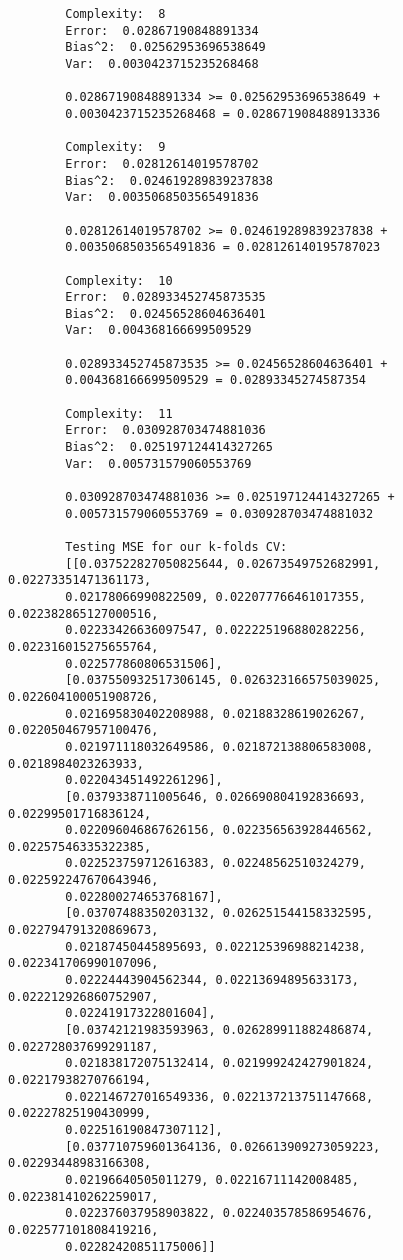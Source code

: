 \begin{verbatim}
        Complexity:  8
        Error:  0.02867190848891334
        Bias^2:  0.02562953696538649
        Var:  0.0030423715235268468
        
        0.02867190848891334 >= 0.02562953696538649 + 
        0.0030423715235268468 = 0.028671908488913336
        
        Complexity:  9
        Error:  0.02812614019578702
        Bias^2:  0.024619289839237838
        Var:  0.0035068503565491836
        
        0.02812614019578702 >= 0.024619289839237838 +
        0.0035068503565491836 = 0.028126140195787023
        
        Complexity:  10
        Error:  0.028933452745873535
        Bias^2:  0.02456528604636401
        Var:  0.004368166699509529
        
        0.028933452745873535 >= 0.02456528604636401 + 
        0.004368166699509529 = 0.02893345274587354
        
        Complexity:  11
        Error:  0.030928703474881036
        Bias^2:  0.025197124414327265
        Var:  0.005731579060553769
        
        0.030928703474881036 >= 0.025197124414327265 +
        0.005731579060553769 = 0.030928703474881032
        
        Testing MSE for our k-folds CV:  
        [[0.037522827050825644, 0.02673549752682991, 0.02273351471361173,
        0.02178066990822509, 0.022077766461017355, 0.022382865127000516,
        0.02233426636097547, 0.022225196880282256, 0.022316015275655764,
        0.022577860806531506], 
        [0.037550932517306145, 0.026323166575039025, 0.022604100051908726,
        0.021695830402208988, 0.02188328619026267, 0.022050467957100476,
        0.021971118032649586, 0.021872138806583008, 0.0218984023263933,
        0.022043451492261296], 
        [0.0379338711005646, 0.026690804192836693, 0.02299501716836124,
        0.022096046867626156, 0.022356563928446562, 0.02257546335322385,
        0.022523759712616383, 0.02248562510324279, 0.022592247670643946,
        0.022800274653768167], 
        [0.03707488350203132, 0.026251544158332595, 0.022794791320869673,
        0.02187450445895693, 0.022125396988214238, 0.022341706990107096,
        0.02224443904562344, 0.02213694895633173, 0.022212926860752907,
        0.02241917322801604], 
        [0.03742121983593963, 0.026289911882486874, 0.022728037699291187,
        0.021838172075132414, 0.021999242427901824, 0.02217938270766194,
        0.022146727016549336, 0.022137213751147668, 0.02227825190430999,
        0.022516190847307112], 
        [0.037710759601364136, 0.026613909273059223, 0.02293448983166308,
        0.02196640505011279, 0.02216711142008485, 0.022381410262259017,
        0.022376037958903822, 0.022403578586954676, 0.022577101808419216,
        0.02282420851175006]]

\end{verbatim}

